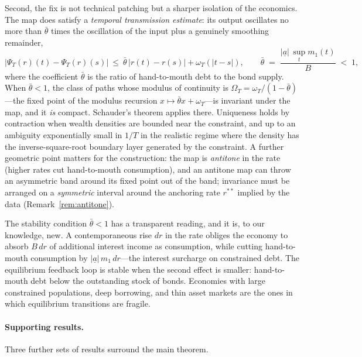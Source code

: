 \documentclass[11pt]{article}
\theoremstyle{definition}
\theoremstyle{remark}
\newcommand{\ubar}[1]{\underline{#1}}
\newcommand{\uba}{\ubar{a}}
\newcommand{\psit}{\Psi_T}
\begin{document}
Second, the fix is not technical patching but a sharper isolation of
the economics. The map does satisfy a \emph{temporal transmission
estimate}: its output oscillates no more than $\bar\theta$ times the
oscillation of the input plus a genuinely smoothing remainder,
\[
|\psit(r)(t)-\psit(r)(s)|\ \le\
\bar\theta\,|r(t)-r(s)|+\omega_T(|t-s|),
\qquad
\bar\theta\;=\;\frac{|\uba|\,\sup_t m_1(t)}{B}\;<\;1,
\]
where the coefficient $\bar\theta$ is the ratio of hand-to-mouth debt
to the bond supply. When $\bar\theta<1$, the class of paths whose
modulus of continuity is $\Omega_T=\omega_T/(1-\bar\theta)$---the
fixed point of the modulus recursion $x\mapsto\bar\theta
x+\omega_T$---is invariant under the map, and it \emph{is} compact.
Schauder's theorem applies there. Uniqueness holds by contraction when
wealth densities are bounded near the constraint, and up to an
ambiguity exponentially small in $1/T$ in the realistic regime where
the density has the inverse-square-root boundary layer generated by
the constraint. A further geometric point matters for the
construction: the map is \emph{antitone} in the rate (higher rates cut
hand-to-mouth consumption), and an antitone map can throw an
asymmetric band around its fixed point out of the band; invariance
must be arranged on a \emph{symmetric} interval around the anchoring
rate $r^{**}$ implied by the data
(Remark~\ref{rem:antitone}).

The stability condition $\bar\theta<1$ has a transparent reading, and
it is, to our knowledge, new. A contemporaneous rise $dr$ in the rate
obliges the economy to absorb $B\,dr$ of additional interest income as
consumption, while cutting hand-to-mouth consumption by
$|\uba|\,m_1\,dr$---the interest surcharge on constrained debt. The
equilibrium feedback loop is stable when the second effect is smaller:
hand-to-mouth debt below the outstanding stock of bonds. Economies
with large constrained populations, deep borrowing, and thin asset
markets are the ones in which equilibrium transitions are fragile.

\paragraph{Supporting results.}
Three further sets of results surround the main theorem.
\end{document}
